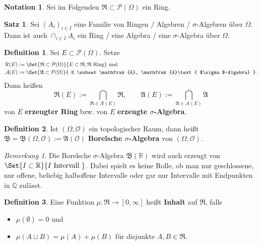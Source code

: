 \documentclass[a4paper,10pt,landscape]{article}
\newcommand{\R}{\mathbb{R}}
\newcommand{\Q}{\mathbb{Q}}
\newcommand{\PS}{\mathcal{P}} %
\newcommand{\PSO}{\PS(\Omega)} %
\newcommand{\Alg}{\mathfrak{A}}
\newcommand{\Ring}{\mathfrak{R}}
\theoremstyle{definition}
\newtheorem*{nota}{Notation}
\newtheorem*{defn}{Definition}
\newtheorem*{satz}{Satz}
\theoremstyle{remark}
\newtheorem*{bem}{Bemerkung}
\renewcommand{\emph}[1]{\textcolor{Emph}{\bf{#1}}}
\begin{document}
\begin{multicols}{3}
\begin{nota}
  Sei im Folgenden $\Ring \subset \PSO$ ein Ring.
\end{nota}


\begin{satz}
  Sei $(A_i)_{i \in I}$ eine Familie von Ringen / Algebren / $\sigma$-Algebren über $\Omega$. Dann ist auch $\cap_{i \in I} A_i$ ein Ring / eine Algebra / eine $\sigma$-Algebra über $\Omega$.
\end{satz}

\begin{defn}
  Sei $E \subset \PSO$. Setze
  \begin{align*}
    \mathcal{R}(E) &:= \Set{ \Ring \subset \PSO }{ E \subset \Ring, \Ring \text{ Ring} } \text{ und} \\
    \mathcal{A}(E) &:= \Set{ \Alg \subset \PSO }{ E \subset \Alg, \Alg \text{ $\sigma$-Algebra} }.
  \end{align*}
  Dann heißen
  \[
    \Ring(E) :=\!\bigcap_{\Ring \in \mathcal{R}(E)}\!\Ring, \qquad
    \Alg(E)  :=\!\bigcap_{\Alg  \in \mathcal{A}(E)}\!\Alg
  \]
  von $E$ \emph{erzeugter Ring} bzw. von $E$ \emph{erzeugte $\sigma$-Algebra}.
\end{defn}

\begin{defn}
  Ist $(\Omega, \mathcal{O})$ ein topologischer Raum, dann heißt $\mathfrak{B} = \mathfrak{B}(\Omega, \mathcal{O}) := \Alg(\mathcal{O})$ \emph{Borelsche $\sigma$-Algebra} von $(\Omega, \mathcal{O})$.
\end{defn}

\begin{bem}
  Die Borelsche $\sigma$-Algebra $\mathfrak{B}(\R)$ wird auch erzeugt von $\Set{I \subset \R }{ I \text{ Intervall } }$. Dabei spielt es keine Rolle, ob man nur geschlossene, nur offene, beliebig halboffene Intervalle oder gar nur Intervalle mit Endpunkten in $\Q$ zulässt.
\end{bem}

\begin{defn}
  Eine Funktion $\mu : \Ring \to [0, \infty]$ heißt \emph{Inhalt} auf $\Ring$, falls
  \begin{itemize}
    \item $\mu(\emptyset) = 0$ und
    \item $\mu(A \sqcup B) = \mu(A) + \mu(B)$ für disjunkte $A, B \in \Ring$.
  \end{itemize}
\end{defn}


\end{multicols}
\end{document}
